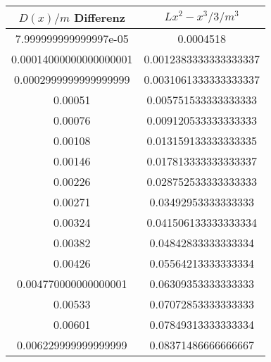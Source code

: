 \begin{table}\caption{}
\label{}
\centering
{}
\begin{tabular}{S[]S[]} 
\toprule
{$D(x)/m$ Differenz} & {$Lx^2-x^3/3 /m^3$}\\
\midrule
7.999999999999997e-05 & 0.0004518\\
0.00014000000000000001 & 0.0012383333333333337\\
0.0002999999999999999 & 0.0031061333333333337\\
0.00051 & 0.005751533333333333\\
0.00076 & 0.009120533333333333\\
0.00108 & 0.013159133333333335\\
0.00146 & 0.017813333333333337\\
0.00226 & 0.028752533333333333\\
0.00271 & 0.03492953333333333\\
0.00324 & 0.041506133333333334\\
0.00382 & 0.04842833333333334\\
0.00426 & 0.05564213333333334\\
0.004770000000000001 & 0.06309353333333333\\
0.00533 & 0.07072853333333333\\
0.00601 & 0.07849313333333334\\
0.006229999999999999 & 0.08371486666666667\\
\bottomrule
\end{tabular}\end{table}
